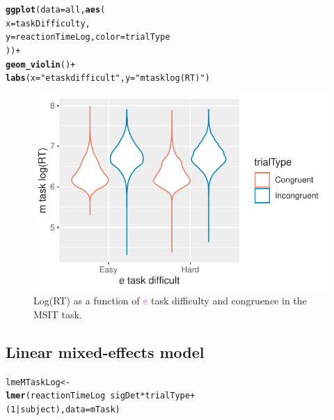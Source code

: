 \documentclass{article}\usepackage[]{graphicx}\usepackage[]{color}
\makeatletter
\newcommand{\hlnum}[1]{\textcolor[rgb]{0.686,0.059,0.569}{#1}}%
\newcommand{\hlstr}[1]{\textcolor[rgb]{0.192,0.494,0.8}{#1}}%
\newcommand{\hlopt}[1]{\textcolor[rgb]{0,0,0}{#1}}%
\newcommand{\hlstd}[1]{\textcolor[rgb]{0.345,0.345,0.345}{#1}}%
\newcommand{\hlkwb}[1]{\textcolor[rgb]{0.69,0.353,0.396}{#1}}%
\newcommand{\hlkwc}[1]{\textcolor[rgb]{0.333,0.667,0.333}{#1}}%
\newcommand{\hlkwd}[1]{\textcolor[rgb]{0.737,0.353,0.396}{\textbf{#1}}}%
\newenvironment{kframe}{%
 \def\at@end@of@kframe{}%
 \ifinner\ifhmode%
  \def\at@end@of@kframe{\end{minipage}}%
  \begin{minipage}{\columnwidth}%
 \fi\fi%
 \def\FrameCommand##1{\hskip\@totalleftmargin \hskip-\fboxsep
 \colorbox{shadecolor}{##1}\hskip-\fboxsep
     \hskip-\linewidth \hskip-\@totalleftmargin \hskip\columnwidth}%
 \MakeFramed {\advance\hsize-\width
   \@totalleftmargin\z@ \linewidth\hsize
   \@setminipage}}%
 {\par\unskip\endMakeFramed%
 \at@end@of@kframe}
\newenvironment{knitrout}{}{} %
\newcommand{\code}[1]{\textup{\texttt{\textcolor{violet}{#1}}}}
\makeatother
\begin{document}
\begin{knitrout}\footnotesize
{}\color{fgcolor}\begin{kframe}
\begin{alltt}
\hlkwd{ggplot}\hlstd{(}\hlkwc{data} \hlstd{= all,} \hlkwd{aes}\hlstd{(}
  \hlkwc{x} \hlstd{= taskDifficulty,}
  \hlkwc{y} \hlstd{= reactionTimeLog,} \hlkwc{color} \hlstd{= trialType}
\hlstd{))} \hlopt{+}
  \hlkwd{geom_violin}\hlstd{()} \hlopt{+}
  \hlkwd{labs}\hlstd{(}\hlkwc{x} \hlstd{=} \hlstr{"e task difficult"}\hlstd{,} \hlkwc{y} \hlstd{=} \hlstr{"m task log(RT)"}\hlstd{)}
\end{alltt}
\end{kframe}
\end{knitrout}

\begin{figure}
\begin{knitrout}\footnotesize
{}\color{fgcolor}

{\centering \includegraphics[width=0.75\linewidth]{figure/graphics-gg_all-show-1} 

}



\end{knitrout}
\caption{Log(RT) as a function of \code{e} task difficulty and congruence in the MSIT task.}\label{fig:eTaskmTaskSub}
\end{figure}


\subsection{Linear mixed-effects model}

\begin{knitrout}\footnotesize
{}\color{fgcolor}\begin{kframe}
\begin{alltt}
\hlstd{lmeMTaskLog} \hlkwb{<-}
  \hlkwd{lmer}\hlstd{(reactionTimeLog} \hlopt{~} \hlstd{sigDet} \hlopt{*} \hlstd{trialType} \hlopt{+}
    \hlstd{(}\hlnum{1} \hlopt{|} \hlstd{subject),} \hlkwc{data} \hlstd{= mTask)}
\end{alltt}
\end{kframe}
\end{knitrout}
\end{document}
